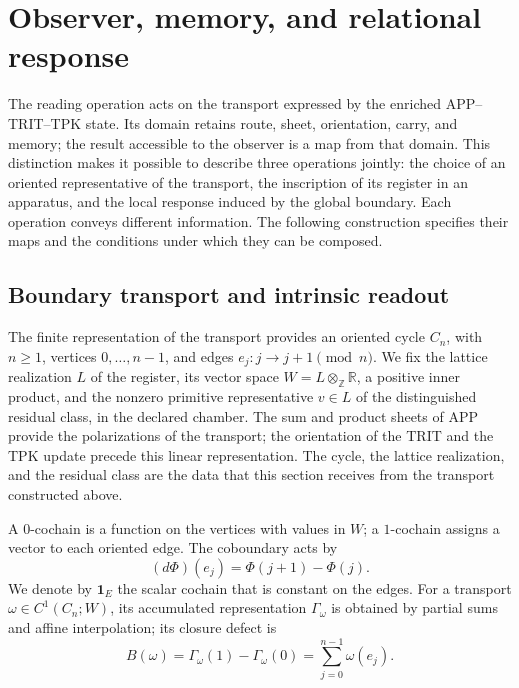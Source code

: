 
\section{Observer, memory, and relational response}
\label{vii:sec:observador-respuesta}

The reading operation acts on the transport expressed by the
enriched APP--TRIT--TPK state. Its domain retains route, sheet, orientation,
carry, and memory; the result accessible to the observer is a map
from that domain. This distinction makes it possible to describe three
operations jointly: the choice of an oriented representative of the transport,
the inscription of its register in an apparatus, and the local response induced
by the global boundary. Each operation conveys different information.
The following construction specifies their maps and the conditions
under which they can be composed.

\subsection{Boundary transport and intrinsic readout}
\label{vii:sec:observador-ciclo}

The finite representation of the transport provides an oriented cycle
\(C_n\), with \(n\geq1\), vertices \(0,\ldots,n-1\), and edges
\(e_j:j\longrightarrow j+1\pmod n\). We fix the lattice realization
\(L\) of the register, its vector space
\(W=L\otimes_{\mathbb Z}\mathbb R\), a positive inner product, and
the nonzero primitive representative \(v\in L\) of the distinguished
residual class, in the declared chamber. The sum and product sheets of APP
provide the polarizations of the transport; the orientation of the TRIT and the
TPK update precede this linear representation. The cycle,
the lattice realization, and the residual class are the data that this
section receives from the transport constructed above.

A \(0\)-cochain is a function on the vertices with values in
\(W\); a \(1\)-cochain assigns a vector to each oriented edge.
The coboundary acts by
\[
 (d\Phi)(e_j)=\Phi(j+1)-\Phi(j).
\]
We denote by \(\mathbf1_E\) the scalar cochain that is constant on the
edges. For a transport \(\omega\in C^1(C_n;W)\), its accumulated
representation \(\Gamma_\omega\) is obtained by partial sums and
affine interpolation; its closure defect is
\begin{equation}
 B(\omega)=\Gamma_\omega(1)-\Gamma_\omega(0)
 =\sum_{j=0}^{n-1}\omega(e_j).
 \label{vii:eq:observador-defecto}
\end{equation}

